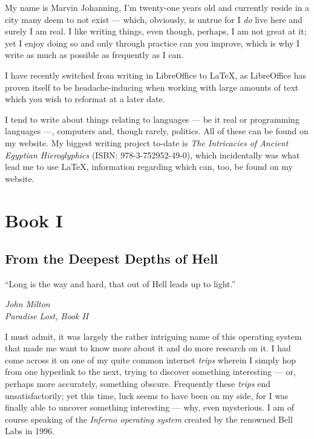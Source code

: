 \documentclass[a5paper,twoside,12pt]{report}
\begin{document}
  My name is Marvin Johanning, I'm twenty-one years old and currently reside in a city many deem to not exist — which, obviously, is untrue for I \textit{do} live here and surely I am real. I like writing things, even though, perhaps, I am not great at it; yet I enjoy doing so and only through practice can you improve, which is why I write as much as possible as frequently as I can.

  I have recently switched from writing in LibreOffice to \LaTeX, as LibreOffice has proven itself to be headache-inducing when working with large amounts of text which you wish to reformat at a later date. 

  I tend to write about things relating to languages — be it real or programming languages —, computers and, though rarely, politics. All of these can be found on my website. My biggest writing project to-date is \textit{The Intricacies of Ancient Egyptian Hieroglyphics} (ISBN: 978-3-752952-49-0), which incidentally was what lead me to use \LaTeX, information regarding which can, too, be found on my website.
  \newpage


\thispagestyle{empty}
  \mbox{}
  \newpage

\part*{Book I}
  \newpage

\thispagestyle{empty}
  \mbox{}
  \newpage

\chapter*{From the Deepest Depths of Hell}

\epigraph{``Long is the way and hard, that out of Hell leads up to light.''}{\textit{John Milton\\Paradise Lost, Book II}}

I must admit, it was largely the rather intriguing name of this operating system that made me want to know more about it and do more research on it. I had come across it on one of my quite common internet \textit{trips} wherein I simply hop from one hyperlink to the next, trying to discover something interesting — or, perhaps more accurately, something obscure. 
Frequently these \textit{trips} end unsatisfactorily; yet this time, luck seems to have been on my side, for I was finally able to uncover something interesting — why, even mysterious. I am of course speaking of the \textit{Inferno operating system} created by the renowned Bell Labs in 1996. 
\end{document}

